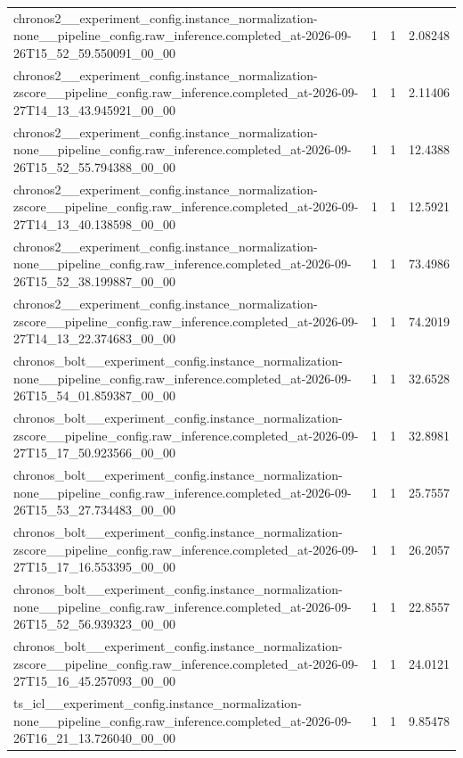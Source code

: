 \begin{tabular}{llll}
chronos2\_\_experiment\_config.instance\_normalization-none\_\_pipeline\_config.raw\_inference.completed\_at-2026-09-26T15\_52\_59.550091\_00\_00 & 1 & 1 & 2.08248 \\
chronos2\_\_experiment\_config.instance\_normalization-zscore\_\_pipeline\_config.raw\_inference.completed\_at-2026-09-27T14\_13\_43.945921\_00\_00 & 1 & 1 & 2.11406 \\
chronos2\_\_experiment\_config.instance\_normalization-none\_\_pipeline\_config.raw\_inference.completed\_at-2026-09-26T15\_52\_55.794388\_00\_00 & 1 & 1 & 12.4388 \\
chronos2\_\_experiment\_config.instance\_normalization-zscore\_\_pipeline\_config.raw\_inference.completed\_at-2026-09-27T14\_13\_40.138598\_00\_00 & 1 & 1 & 12.5921 \\
chronos2\_\_experiment\_config.instance\_normalization-none\_\_pipeline\_config.raw\_inference.completed\_at-2026-09-26T15\_52\_38.199887\_00\_00 & 1 & 1 & 73.4986 \\
chronos2\_\_experiment\_config.instance\_normalization-zscore\_\_pipeline\_config.raw\_inference.completed\_at-2026-09-27T14\_13\_22.374683\_00\_00 & 1 & 1 & 74.2019 \\
chronos\_bolt\_\_experiment\_config.instance\_normalization-none\_\_pipeline\_config.raw\_inference.completed\_at-2026-09-26T15\_54\_01.859387\_00\_00 & 1 & 1 & 32.6528 \\
chronos\_bolt\_\_experiment\_config.instance\_normalization-zscore\_\_pipeline\_config.raw\_inference.completed\_at-2026-09-27T15\_17\_50.923566\_00\_00 & 1 & 1 & 32.8981 \\
chronos\_bolt\_\_experiment\_config.instance\_normalization-none\_\_pipeline\_config.raw\_inference.completed\_at-2026-09-26T15\_53\_27.734483\_00\_00 & 1 & 1 & 25.7557 \\
chronos\_bolt\_\_experiment\_config.instance\_normalization-zscore\_\_pipeline\_config.raw\_inference.completed\_at-2026-09-27T15\_17\_16.553395\_00\_00 & 1 & 1 & 26.2057 \\
chronos\_bolt\_\_experiment\_config.instance\_normalization-none\_\_pipeline\_config.raw\_inference.completed\_at-2026-09-26T15\_52\_56.939323\_00\_00 & 1 & 1 & 22.8557 \\
chronos\_bolt\_\_experiment\_config.instance\_normalization-zscore\_\_pipeline\_config.raw\_inference.completed\_at-2026-09-27T15\_16\_45.257093\_00\_00 & 1 & 1 & 24.0121 \\
ts\_icl\_\_experiment\_config.instance\_normalization-none\_\_pipeline\_config.raw\_inference.completed\_at-2026-09-26T16\_21\_13.726040\_00\_00 & 1 & 1 & 9.85478 \\

\end{tabular}
